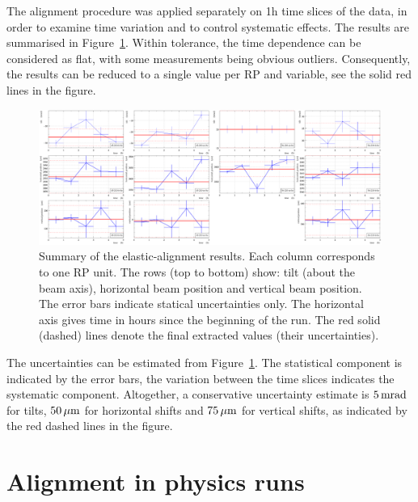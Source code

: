 \documentclass[TOTEM]{cern/cernphprep}
\def\un#1{\,{\rm #1}}
\begin{document}
The alignment procedure was applied separately on 1h time slices of the data, in order to examine time variation and to control systematic effects. The results are summarised in Figure~\ref{fig:el_alignment_results}. Within tolerance, the time dependence can be considered as flat, with some measurements being obvious outliers. Consequently, the results can be reduced to a single value per RP and variable, see the solid red lines in the figure.

\begin{figure}[h!]
\begin{center}
\includegraphics[width=\hsize]{fig/calibration_fill/el_alignment.pdf}
\caption{%
Summary of the elastic-alignment results. Each column corresponds to one RP unit. The rows (top to bottom) show: tilt (about the beam axis), horizontal beam position and vertical beam position. The error bars indicate statical uncertainties only. The horizontal axis gives time in hours since the beginning of the run. The red solid (dashed) lines denote the final extracted values (their uncertainties).
}
\label{fig:el_alignment_results}
\end{center}
\end{figure}

The uncertainties can be estimated from Figure~\ref{fig:el_alignment_results}. The statistical component is indicated by the error bars, the variation between the time slices indicates the systematic component. Altogether, a conservative uncertainty estimate is $5\un{mrad}$ for tilts, $50\un{\mu m}$ for horizontal shifts and $75\un{\mu m}$ for vertical shifts, as indicated by the red dashed lines in the figure.


\section{Alignment in physics runs}
\label{s:phys}
\end{document}
